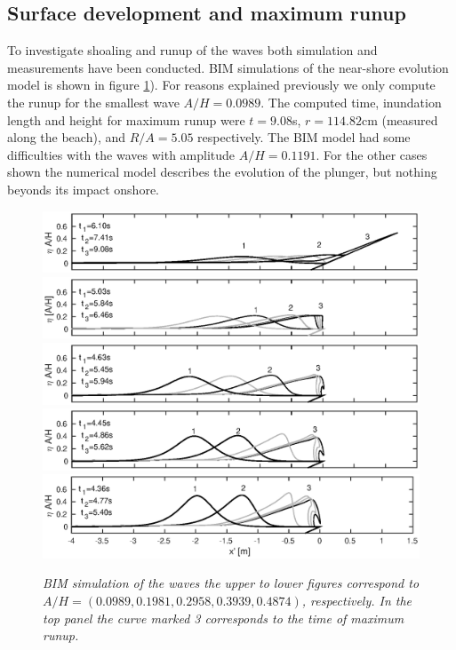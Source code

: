 \documentclass[a4paper, 11pt, english, twoside, openright]{article}
\begin{document}
\subsection{Surface development and maximum runup}
\label{max_run}

To investigate shoaling and runup of the waves 
both simulation and measurements have been conducted. 
BIM simulations of the near-shore evolution model is shown in figure \ref{fig:BIM}).
For reasons explained previously we only compute the runup for the 
smallest wave $A/H=0.0989$. The computed time, inundation length and height for 
maximum runup  
were $t=9.08$s, $r=114.82$cm (measured along the beach), and $R/A=5.05$ 
respectively. The BIM model had some difficulties with the waves with amplitude $A/H=0.1191$. For the other cases shown the numerical
model describes the evolution of the plunger, but nothing beyonds its impact onshore.  
\begin{figure}[]
\centering 
\includegraphics[width=\textwidth]{./Figures/BIM_s/case10.eps}
\includegraphics[width=\textwidth]{./Figures/BIM_s/case20.eps}
\includegraphics[width=\textwidth]{./Figures/BIM_s/case30.eps}
\includegraphics[width=\textwidth]{./Figures/BIM_s/case40.eps}
\includegraphics[width=1.015\textwidth]{./Figures/BIM_s/case50.eps}
\caption{\textit{BIM simulation of the waves the upper to lower figures correspond to $A/H=(0.0989, 0.1981, 0.2958, 0.3939, 0.4874)$, respectively. In the top panel the curve marked 3 corresponds to the time of maximum runup.}}
\label{fig:BIM}
\end{figure}
\end{document}
